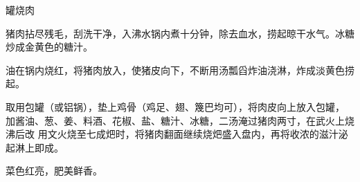 \begin{recipe}[东坡肉]{罐烧肉}

\ingredients


\preparation

\step 猪肉拈尽残毛，刮洗干净，入沸水锅内煮十分钟，除去血水，捞起晾干水气。冰糖
炒成金黄色的糖汁。

\step 油在锅内烧红，将猪肉放入，使猪皮向下，不断用汤瓢舀炸油浇淋，炸成淡黄色捞
起。

\step 取用包罐（或铝锅），垫上鸡骨（鸡足、翅、篾巴均可），将肉皮向上放入包罐，
加酱油、葱、姜、料酒、花椒、盐、糖汁、冰糖，二汤淹过猪肉两寸，在武火上烧沸后改
用文火烧至七成𤆵时，将猪肉翻面继续烧𤆵盛入盘内，再将收浓的滋汁泌起淋上即成。

\features

菜色红亮，肥美鲜香。

\end{recipe}

